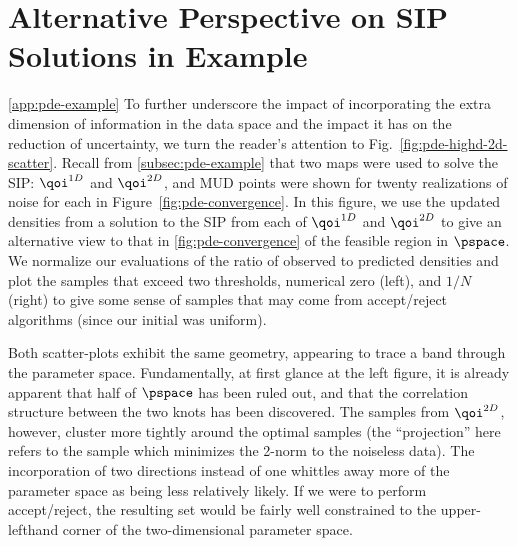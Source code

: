 % 
\section{Alternative Perspective on SIP Solutions in Example}\ref{app:pde-example}
To further underscore the impact of incorporating the extra dimension of information in the data space and the impact it has on the reduction of uncertainty, we turn the reader's attention to Fig.~\ref{fig:pde-highd-2d-scatter}.
Recall from \ref{subsec:pde-example} that two maps were used to solve the SIP: $\qoi^{1D}$ and $\qoi^{2D}$, and MUD points were shown for twenty realizations of noise for each in Figure~\ref{fig:pde-convergence}.
In this figure, we use the updated densities from a solution to the SIP from each of $\qoi^{1D}$ and $\qoi^{2D}$ to give an alternative view to that in \ref{fig:pde-convergence} of the feasible region in $\pspace$.
We normalize our evaluations of the ratio of observed to predicted densities and plot the samples that exceed two thresholds, numerical zero (left), and $1/N$ (right) to give some sense of samples that may come from accept/reject algorithms (since our initial was uniform).

Both scatter-plots exhibit the same geometry, appearing to trace a band through the parameter space.
Fundamentally, at first glance at the left figure, it is already apparent that half of $\pspace$ has been ruled out, and that the correlation structure between the two knots has been discovered.
The samples from $\qoi^{2D}$, however, cluster more tightly around the optimal samples (the ``projection'' here refers to the sample which minimizes the 2-norm to the noiseless data).
The incorporation of two directions instead of one whittles away more of the parameter space as being less relatively likely.
If we were to perform accept/reject, the resulting set would be fairly well constrained to the upper-lefthand corner of the two-dimensional parameter space.

